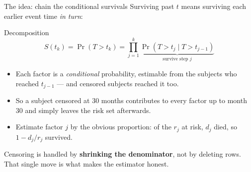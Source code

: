 \documentclass[aspectratio=169,11pt]{beamer}
\begin{document}
\begin{frame}{The idea: chain the conditional survivals}
  \scriptsize
  Surviving past $t$ means surviving each earlier event time \emph{in turn}:
  \begin{block}{Decomposition}
    \[
      S(t_k)=\Pr(T>t_k)
            =\prod_{j=1}^{k}\underbrace{\Pr(T>t_j \mid T>t_{j-1})}_{\text{survive step }j}
    \]
  \end{block}
  \begin{readme}
    \begin{itemize}
      \item Each factor is a \emph{conditional} probability, estimable from the subjects
            who reached $t_{j-1}$ --- and censored subjects reached it too.
      \item So a subject censored at $30$ months contributes to every factor up to
            month $30$ and simply leaves the risk set afterwards.
      \item Estimate factor $j$ by the obvious proportion: of the $r_j$ at risk,
            $d_j$ died, so $1-d_j/r_j$ survived.
    \end{itemize}
  \end{readme}
  \begin{takeaway}
    Censoring is handled by \textbf{shrinking the denominator}, not by deleting rows.
    That single move is what makes the estimator honest.
  \end{takeaway}
\end{frame}
\end{document}
